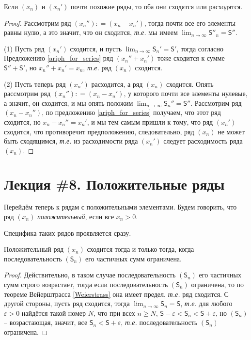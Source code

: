 \begin{lemma}\label{almost_for_series}
    Если $(x_n)$ и $(x_n')$ почти похожие ряды, то оба они сходятся или расходятся.
\end{lemma}
\begin{proof}
    Рассмотрим ряд $(x_n''): = (x_n - x_n')$, тогда почти все его элементы равны нулю, а это значит, что он сходится, \textit{т.е.} мы имеем $ \lim_{n \to \infty} \mathsf{S}''_n = \mathsf{S}''$. 

(1) Пусть ряд $(x_n')$ сходится, и пусть $\lim_{n \to \infty}\mathsf{S}_n' =\mathsf{S}'$, тогда согласно Предложению \ref{ariph_for_series} ряд $(x_n'' + x_n')$ тоже сходится к сумме $\mathsf{S}''+\mathsf{S}'$, но $x_n''+x_n' = x_n$, \textit{т.е.} ряд $(x_n)$ сходится.

(2) Пусть теперь ряд $(x_n')$ расходится, а ряд $(x_n)$ сходится. Опять рассмотрим ряд $(x_n''): = (x_n - x_n')$, у которого почти все элементы нулевые, а значит, он сходится, и мы опять положим $\lim_{n \to \infty}\mathsf{S}_n'' = \mathsf{S}''.$ Рассмотрим ряд $(x_n - x_n'')$, по предложению \ref{ariph_for_series} получаем, что этот ряд сходится, но $x_n - x_n'' = x_n'$, и мы тем самым пришли к тому, что ряд $(x_n')$ сходится, что противоречит предположению, следовательно, ряд $(x_n)$ не может быть сходящимся, \textit{т.е.} из расходимости ряда $(x_n')$ следует расходимость ряда $(x_n).$
\end{proof}


\section{Лекция \#8. Положительные ряды}

Перейдём теперь к рядам с положительными элементами. Будем говорить, что ряд $(x_n)$ \textit{положительный}, если все $x_n >0$.

Специфика таких рядов проявляется сразу.

\begin{theorem}\label{criteria_for_positive_series}
    Положительный ряд $(x_n)$ сходится тогда и только тогда, когда последовательность $(\mathsf{S}_n)$ его частичных сумм ограничена.
\end{theorem}
    \begin{proof}
    Действительно, в таком случае последовательность $(\mathsf{S}_n)$ его частичных сумм строго возрастает, тогда если последовательность $(\mathsf{S}_n)$ ограничена, то по теореме Вейерштрасса \ref{Weierstrass} она имеет предел, \textit{т.е.} ряд сходится. С другой стороны, пусть ряд сходится, тогда $\lim_{n\to \infty} \mathsf{S}_n =\mathsf{S}$, \textit{т.е.} для любого $\varepsilon >0$ найдётся такой номер $N$, что при всех $n \ge N$, $\mathsf{S}-\varepsilon < \mathsf{S}_n < \mathsf{S}+ \varepsilon$, но $(\mathsf{S}_n)$ -- возрастающая, значит, все $\mathsf{S}_n < \mathsf{S} + \varepsilon$, \textit{т.е.} последовательность $(\mathsf{S}_n)$ ограничена.
\end{proof}

